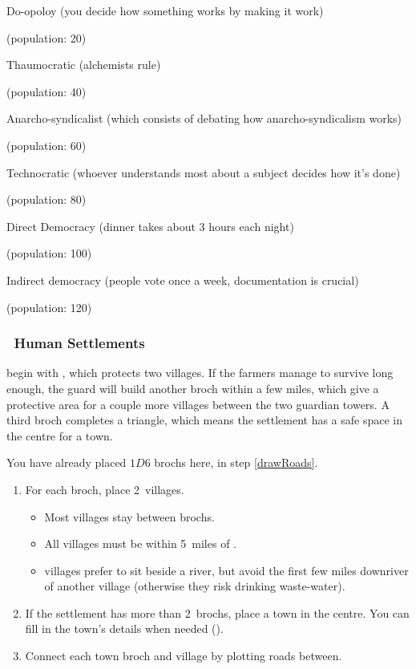 \begin{multicols}{2}
\begin{dlist}
  \item
  Do-opoloy (you decide how something works by making it work)

  (population: 20)
  \item
  Thaumocratic (alchemists rule)

  (population: 40)
  \item
  Anarcho-syndicalist (which consists of debating how anarcho-syndicalism works)

  (population: 60)
  \item
  Technocratic (whoever understands most about a subject decides how it's done)

  (population: 80)
  \item
  Direct Democracy (dinner takes about 3 hours each night)

  (population: 100)
  \item
  Indirect democracy (people vote once a week, documentation is crucial)

  (population: 120)
\end{dlist}

\subsubsection[Human Settlements]{\Hu\ Human Settlements}
\label{humanPoint}
begin with , which protects two \glspl{village}.
If the farmers manage to survive long enough, the \gls{guard} will build another \gls{broch} within a few miles, which give a protective area for a couple more \glspl{village} between the two guardian towers.
A third \gls{broch} completes a triangle, which means the settlement has a safe space in the centre for a town.

You have already placed $1D6$ \glspl{broch} here, in step \vref{drawRoads}.

\begin{enumerate}
  \item
  For each \gls{broch}, place 2~\glspl{village}.
  \begin{itemize}
    \item
    Most \glspl{village} stay between \glspl{broch}.
    \item
    All \glspl{village} must be within 5~miles of .
    \item
    \Glspl{village} prefer to sit beside a river, but avoid the first few miles downriver of another \gls{village} (otherwise they risk drinking waste-water).
  \end{itemize}
  \item
  If the settlement has more than 2~\glspl{broch}, place a town in the centre.
  You can fill in the town's details when needed ().
  \item
  Connect each town \gls{broch} and \gls{village} by plotting roads between.
\end{enumerate}


\end{multicols}
